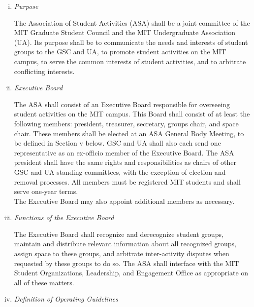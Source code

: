 \documentclass[12pt]{article}
\begin{document}
\begin{enumerate}[i.]
\item \textit{Purpose}

The Association of Student Activities (ASA) shall be a joint committee of the MIT Graduate Student Council and the MIT Undergraduate Association (UA). Its purpose shall be to communicate the needs and interests of student groups to the GSC and UA, to promote student activities on the MIT campus, to serve the common interests of student activities, and to arbitrate conflicting interests.

\item \textit{Executive Board}

The ASA shall consist of an Executive Board responsible for overseeing student activities on the MIT campus. This Board shall consist of at least the following members: president, treasurer, secretary, groups chair, and space chair. These members shall be elected at an ASA General Body Meeting, to be defined in Section v below. GSC and UA shall also each send one representative as an ex-officio member of the Executive Board. The ASA president shall have the same rights and responsibilities as chairs of other GSC and UA standing committees, with the exception of election and removal processes. All members must be registered MIT students and shall serve one-year terms.
\\

The Executive Board may also appoint additional members as necessary.

\item \textit{Functions of the Executive Board}

The Executive Board shall recognize and derecognize student groups, maintain and distribute relevant information about all recognized groups, assign space to these groups, and arbitrate inter-activity disputes when requested by these groups to do so. The ASA shall interface with the MIT Student Organizations, Leadership, and Engagement Office as appropriate on all of these matters.

\item \textit{Definition of Operating Guidelines}
\label{bylaws:5iv}


\end{enumerate}
\end{document}
